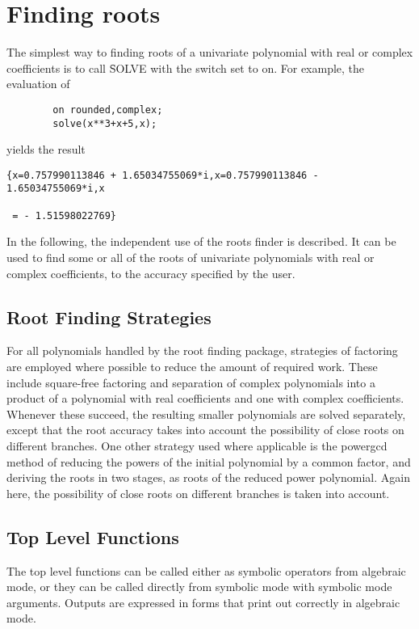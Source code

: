 \section{Finding roots}
\hypertarget{package:ROOTS}{}

The simplest way to finding roots of a univariate polynomial with real
or complex coefficients is to call \f{SOLVE} with the switch
 set to on. For example, the evaluation of
\begin{verbatim}
        on rounded,complex;
        solve(x**3+x+5,x);
\end{verbatim}
yields the result
\begin{verbatim}
{x=0.757990113846 + 1.65034755069*i,x=0.757990113846 - 1.65034755069*i,x

 = - 1.51598022769}
\end{verbatim}

In the following, the independent use of the roots finder is
described. It can be used to find some or all of the roots of
univariate polynomials with real or complex coefficients, to the
accuracy specified by the user.

\subsection{Root Finding Strategies}

For all polynomials handled by the root finding package, strategies of
factoring are employed where possible to reduce the amount of required
work.  These include square-free factoring and separation of complex
polynomials into a product of a polynomial with real coefficients and one
with complex coefficients.  Whenever these succeed, the resulting smaller
polynomials are solved separately, except that the root accuracy takes
into account the possibility of close roots on different branches.  One
other strategy used where applicable is the powergcd method of reducing
the powers of the initial polynomial by a common factor, and deriving the
roots in two stages, as roots of the reduced power polynomial.  Again
here, the possibility of close roots on different branches is taken into
account.

\subsection{Top Level Functions}

The top level functions can be called either as symbolic operators from
algebraic mode, or they can be called directly from symbolic mode with
symbolic mode arguments.  Outputs are expressed in forms that print out
correctly in algebraic mode.


